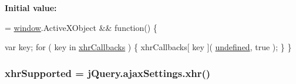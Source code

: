 {\bfseries Initial value\+:}
\begin{DoxyCode}
= \hyperlink{jquery-1_89_81_8js_a04a8a2bbfa9c15500892b8e5033d625b}{window}.ActiveXObject && \textcolor{keyword}{function}() \{
        
        var key;
        \textcolor{keywordflow}{for} ( key in \hyperlink{jquery-1_89_81_8js_a068f27a70831ff3a9e0ffa79e063847f}{xhrCallbacks} ) \{
            xhrCallbacks[ key ]( \hyperlink{jquery-1_89_81_8js_a08113a236cc18d2a9d5ce27e638012be}{undefined}, true );
        \}
    \}
\end{DoxyCode}
\hypertarget{jquery-1_89_81_8js_afd7e72f2f357a5a8b17e46776a6283eb}{
\subsubsection[{xhr\+Supported}]{\setlength{\rightskip}{0pt plus 5cm}xhr\+Supported = {\bf j\+Query.\+ajax\+Settings.\+xhr}()}}\label{jquery-1_89_81_8js_afd7e72f2f357a5a8b17e46776a6283eb}
